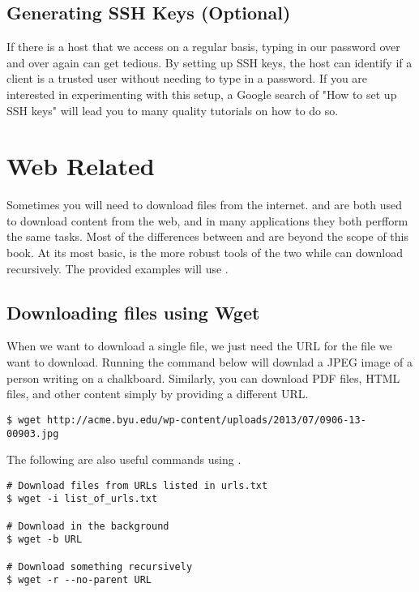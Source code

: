 \subsection*{Generating SSH Keys (Optional)} %

If there is a host that we access on a regular basis, typing in our password over and over again can get tedious.
By setting up SSH keys, the host can identify if a client is a trusted user without needing to type in a password.
If you are interested in experimenting with this setup, a Google search of "How to set up SSH keys" will lead you to many quality tutorials on how to do so.

\section*{Web Related} %

Sometimes you will need to download files from the internet.
 and  are both used to download content from the web, and in many applications they both perfform the same tasks.
Most of the differences between  and  are beyond the scope of this book.
At its most basic,  is the more robust tools of the two while  can download recursively.
The provided examples will use .

\subsection*{Downloading files using Wget} %

When we want to download a single file, we just need the URL for the file we want to download.
Running the command below will downlad a JPEG image of a person writing on a chalkboard.
Similarly, you can download PDF files, HTML files, and other content simply by providing a different URL.

\begin{lstlisting}
$ wget http://acme.byu.edu/wp-content/uploads/2013/07/0906-13-00903.jpg
\end{lstlisting}

The following are also useful commands using .

\begin{lstlisting}
# Download files from URLs listed in urls.txt
$ wget -i list_of_urls.txt

# Download in the background
$ wget -b URL

# Download something recursively
$ wget -r --no-parent URL
\end{lstlisting}

